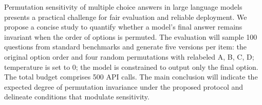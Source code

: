 Permutation sensitivity of multiple choice answers in large language models presents a practical challenge for fair evaluation and reliable deployment. We propose a concise study to quantify whether a model's final answer remains invariant when the order of options is permuted. The evaluation will sample 100 questions from standard benchmarks and generate five versions per item: the original option order and four random permutations with relabeled A, B, C, D; temperature is set to 0; the model is constrained to output only the final option. The total budget comprises 500 API calls. The main conclusion will indicate the expected degree of permutation invariance under the proposed protocol and delineate conditions that modulate sensitivity.
